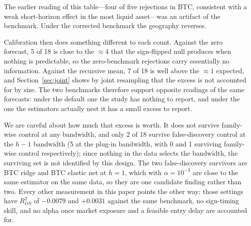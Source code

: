 \documentclass{article}
\theoremstyle{plain}
\theoremstyle{definition}
\newcommand{\rsq}{R^2_{OS}}
\begin{document}
The earlier reading of this table---four of five rejections in BTC, consistent with
a weak short-horizon effect in the most liquid asset---was an artifact of the
benchmark. Under the corrected benchmark the geography reverses.

Calibration then does something different to each count. Against the zero forecast,
5 of 18 is close to the $\approx 4$ that the sign-flipped null produces when nothing is
predictable, so the zero-benchmark rejections carry essentially no information. Against the
recursive mean, 7 of 18 is well above the $\approx 1$ expected, and Section~\ref{sec:joint}
shows by joint resampling that the excess is not accounted for by size. The two benchmarks therefore support opposite readings of
the same forecasts: under the default one the study has nothing to report, and under
the one the estimators actually nest it has a small excess to report.

We are careful about how much that excess is worth. It does not survive family-wise
control at any bandwidth, and only 2 of 18 survive false-discovery control at the
$h-1$ bandwidth (5 at the plug-in bandwidth, with 0 and 1 surviving family-wise
control respectively); since nothing in the data selects the bandwidth, the
surviving set is not identified by this design. The two false-discovery survivors
are BTC ridge and BTC elastic net at $h=1$, which with $\alpha = 10^{-3}$ are close
to the same estimator on the same data, so they are one candidate finding rather
than two. Every other measurement in this paper points the other way: those settings
have $\rsq$ of $-0.0079$ and $+0.0031$ against the same benchmark, no sign-timing skill, and no alpha
once market exposure and a feasible entry delay are accounted for.
\end{document}
